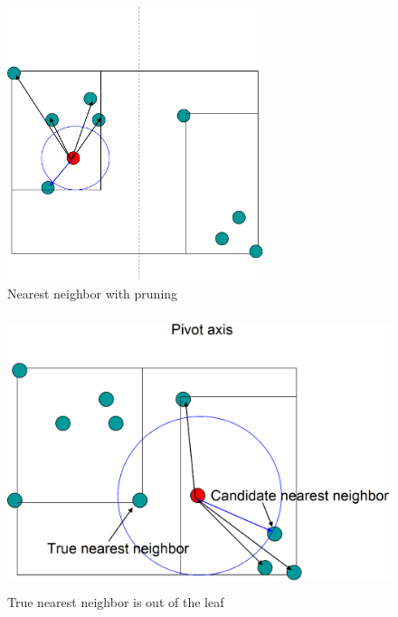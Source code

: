 \documentclass[12pt,letterpaper,doublespaced,ETD,dvips,proposal]{gtthesis}
\begin{document}
\begin{Body}

\begin{figure}[!htb]
\label{nearest_neighbor_searchon_kd}
\centerline{\includegraphics[height=8cm]{nearest_neighbor_searchon_kd.eps}}
\caption{Nearest neighbor with pruning}
\end{figure}


\begin{figure}[!htb]
\label{nearest_neighbor_searchon_kd_true_neighbor}
\centerline{\includegraphics[height=8cm]{nearest_neighbor_searchon_kd_true_neighbor.eps}}
\caption{True nearest neighbor is out of the leaf}
\end{figure}



\end{Body}
\end{document}
